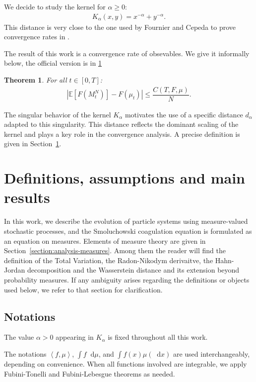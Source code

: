 \documentclass[11pt,a4paper]{article}
\newcommand{\E}[1]{\mathbb{E}\left[#1\right]}
\newcommand{\brac}[1]{\left\langle#1\right\rangle}
\newcommand{\dd}{\mathop{}\!\mathrm{d}}
\newtheorem{theorem}{Theorem}[section]
\begin{document}
We decide to study the kernel for $\alpha \geq 0$:
\begin{align*}
    K_\alpha(x,y) = x^{-\alpha} + y^{-\alpha}.
\end{align*}
This distance is very close to the one used by Fournier and Cepeda to prove convergence rates in \cite{fournier2015rate}.

The result of this work is a convergence rate of obsevables. We give it informally below, the official version is in \ref{section-main-results}
\begin{theorem}
    For all $t \in [0,T]$:
    \begin{align*}
    \left|\E{F\left(M^N_t\right)} - F(\mu_t) \right| \leq  \dfrac{C(T,F,\mu)}{N} .
    \end{align*}
\end{theorem}

The singular behavior of the kernel $K_\alpha$ motivates the use of a specific distance $d_\alpha$ adapted to this singularity. This distance reflects the dominant scaling of the kernel and plays a key role in the convergence analysis. A precise definition is given in Section~\ref{section-main-results}.

\section{Definitions, assumptions and main results}\label{section-main-results}
In this work, we describe the evolution of particle systems using measure-valued stochastic processes, and the Smoluchowski coagulation equation is formulated as an equation on measures. Elements of measure theory are given in Section~\ref{section:analysis-measures}. Among them the reader will find the definition of the Total Variation, the Radon-Nikodym derivaitve, the Hahn-Jordan decomposition and the Wasserstein distance and its extension beyond probability measures. If any ambiguity arises regarding the definitions or objects used below, we refer to that section for clarification.


\subsection{Notations}
The value $\alpha > 0$ appearing in $K_\alpha$ is fixed throughout all this work. 

The notations $\brac{f,\mu}$, $\int f \dd \mu$, and $\int f(x)\mu(\dd x)$ are used interchangeably, depending on convenience. When all functions involved are integrable, we apply Fubini-Tonelli and Fubini-Lebesgue theorems as needed.
\end{document}
